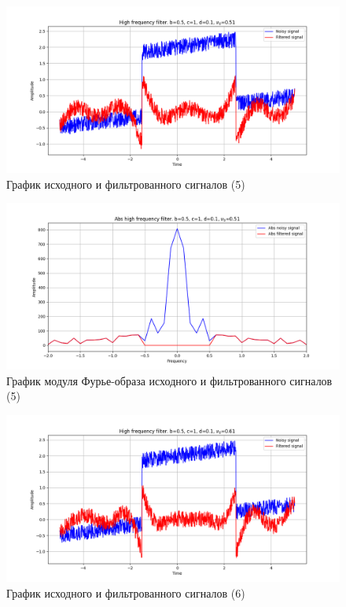 \documentclass[a4paper, 12pt]{article}
\begin{document}
    \begin{figure}[!htb]
        \centering
        \includegraphics[scale=0.48]{5_u_flt_u_nolow.png}
        \captionsetup{skip=0pt}
        \caption{График исходного и фильтрованного сигналов (5)}
        \label{fig:fig35}
    \end{figure}
    \begin{figure}[!htb]
        \centering
        \includegraphics[scale=0.48]{5_abs_u_U_nolow.png}
        \captionsetup{skip=0pt}
        \caption{График модуля Фурье-образа исходного и фильтрованного сигналов (5)}
        \label{fig:fig36}
    \end{figure}
    \begin{figure}[!htb]
        \centering
        \includegraphics[scale=0.48]{6_u_flt_u_nolow.png}
        \captionsetup{skip=0pt}
        \caption{График исходного и фильтрованного сигналов (6)}
        \label{fig:fig37}
    \end{figure}
\end{document}
